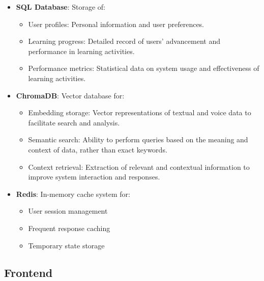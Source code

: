 \begin{itemize}
	\item \textbf{SQL Database}: Storage of:
		  \begin{itemize}
			  \item User profiles: Personal information and user preferences.
			  \item Learning progress: Detailed record of users' advancement and performance in learning activities.
			  \item Performance metrics: Statistical data on system usage and effectiveness of learning activities.
		  \end{itemize}

	\item \textbf{ChromaDB}: Vector database for:
		  \begin{itemize}
			  \item Embedding storage: Vector representations of textual and voice data to facilitate search and analysis.
			  \item Semantic search: Ability to perform queries based on the meaning and context of data, rather than exact keywords.
		      \item Context retrieval: Extraction of relevant and contextual information to improve system interaction and responses.
	      \end{itemize}

	\item \textbf{Redis}: In-memory cache system for:
	      \begin{itemize}
		      \item User session management
		      \item Frequent response caching
		      \item Temporary state storage
	      \end{itemize}
\end{itemize}

\subsection{Frontend}

